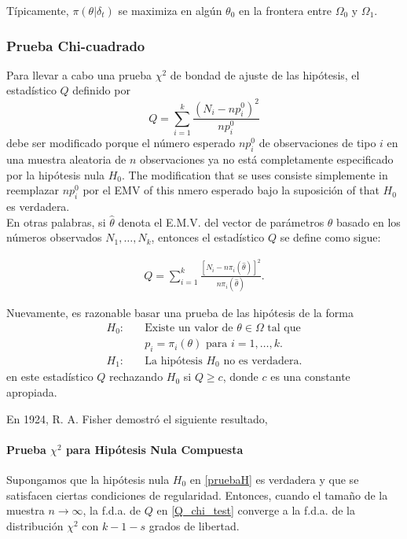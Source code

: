 \documentclass{book}
\begin{document}
Típicamente, $\pi(\theta|\delta_t)$ se maximiza en algún $\theta_0$ en la frontera entre $\Omega_0$ y $\Omega_1$.


\subsubsection{Prueba Chi-cuadrado}
Para llevar a cabo una prueba $\chi^2$ de bondad de ajuste de las hipótesis, el estadístico $Q$ definido por 
$$Q = \sum_{i=1}^{k} \frac{(N_i - np_i^0)^2}{np_i^0}$$
debe ser modificado porque el número esperado $np_i^0$ de observaciones de tipo $i$ en una muestra aleatoria de $n$ observaciones ya no está completamente especificado por la hipótesis nula $H_0$. The modification that se uses consiste simplemente in reemplazar $np_i^0$ por el EMV of this nmero esperado bajo la suposición of that $H_0$ es verdadera.\\
En otras palabras, si $\hat{\theta}$ denota el E.M.V. del vector de parámetros $\theta$ basado en los números observados $N_1, \ldots, N_k$, entonces el estadístico $Q$ se define como sigue:

\begin{align} \label{Q_chi_test}
Q = \sum_{i=1}^{k} \frac{[N_i - n\pi_i(\hat{\theta})]^2}{n\pi_i(\hat{\theta})}.
\end{align}

Nuevamente, es razonable basar una prueba de las hipótesis de la forma
\begin{align} \label{pruebaH}
H_0: \quad &\text{Existe un valor de } \theta \in \Omega \text{ tal que}\\
&p_i = \pi_i(\theta) \text{ para } i = 1, \ldots, k.\\
H_1: \quad &\text{La hipótesis } H_0 \text{ no es verdadera.}
\end{align}
en este estadístico $Q$ rechazando $H_0$ si $Q \geq c$, donde $c$ es una constante apropiada. 

En 1924, R. A. Fisher demostró el siguiente resultado,

\paragraph{Prueba $\chi^2$ para Hipótesis Nula Compuesta}

Supongamos que la hipótesis nula $H_0$ en \ref{pruebaH} es verdadera y que se satisfacen ciertas condiciones de regularidad. Entonces, cuando el tamaño de la muestra $n \to \infty$, la f.d.a. de $Q$ en \ref{Q_chi_test} converge a la f.d.a. de la distribución $\chi^2$ con $k - 1 - s$ grados de libertad.
\end{document}
